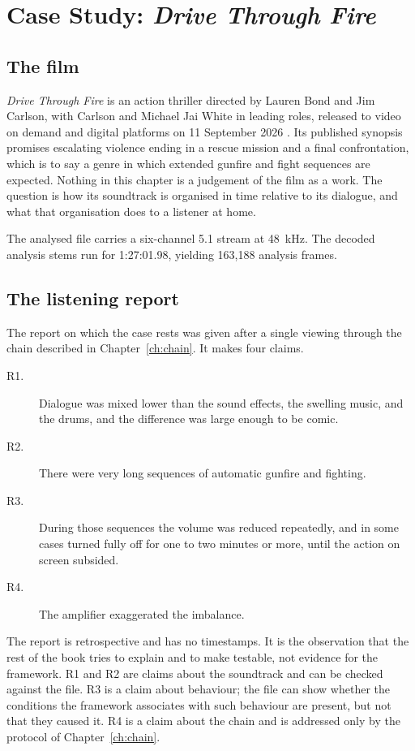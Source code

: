 \chapter{Case Study: \emph{Drive Through Fire}}
\label{ch:case}

\section{The film}

\emph{Drive Through Fire} is an action thriller directed by Lauren Bond and Jim Carlson, with Carlson and Michael Jai White in leading roles, released to video on demand and digital platforms on 11 September 2026 \citep{comingsoon2026}. Its published synopsis promises escalating violence ending in a rescue mission and a final confrontation, which is to say a genre in which extended gunfire and fight sequences are expected. Nothing in this chapter is a judgement of the film as a work. The question is how its soundtrack is organised in time relative to its dialogue, and what that organisation does to a listener at home.

The analysed file carries a six-channel 5.1 stream at 48~kHz. The decoded analysis stems run for 1:27:01.98, yielding 163{,}188 analysis frames.

\section{The listening report}

The report on which the case rests was given after a single viewing through the chain described in Chapter~\ref{ch:chain}. It makes four claims.

\begin{description}
\item[R1.] Dialogue was mixed lower than the sound effects, the swelling music, and the drums, and the difference was large enough to be comic.
\item[R2.] There were very long sequences of automatic gunfire and fighting.
\item[R3.] During those sequences the volume was reduced repeatedly, and in some cases turned fully off for one to two minutes or more, until the action on screen subsided.
\item[R4.] The amplifier exaggerated the imbalance.
\end{description}

The report is retrospective and has no timestamps. It is the observation that the rest of the book tries to explain and to make testable, not evidence for the framework. R1 and R2 are claims about the soundtrack and can be checked against the file. R3 is a claim about behaviour; the file can show whether the conditions the framework associates with such behaviour are present, but not that they caused it. R4 is a claim about the chain and is addressed only by the protocol of Chapter~\ref{ch:chain}.

